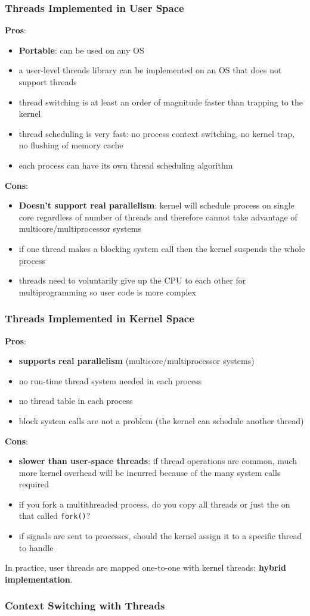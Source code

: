 \documentclass{article}
\renewcommand{\b}{\item[$\circ$]}
\newcommand{\newlist}{\begin{itemize}}
\renewcommand{\endlist}{\end{itemize}}
\begin{document}
    \subsubsection{Threads Implemented in User Space}

    \textbf{Pros}:
    \newlist
    \b \textbf{Portable}: can be used on any OS
    \b a user-level threads library can be implemented on an OS that does not support threads
    \b thread switching is at least an order of magnitude faster than trapping to the kernel
    \b thread scheduling is very fast: no process context switching, no kernel trap, no flushing of memory cache
    \b each process can have its own thread scheduling algorithm
    \endlist

    \noindent \textbf{Cons}:
    \newlist
    \b \textbf{Doesn't support real parallelism}: kernel will schedule process on single core regardless of number of threads and therefore cannot take advantage of multicore/multiprocessor systems
    \b if one thread makes a blocking system call then the kernel suspends the whole process
    \b threads need to voluntarily give up the CPU to each other for multiprogramming so user code is more complex
    \endlist

    \subsubsection{Threads Implemented in Kernel Space}

    \textbf{Pros}:
    \newlist
    \b \textbf{supports real parallelism} (multicore/multiprocessor systems)
    \b no run-time thread system needed in each process
    \b no thread table in each process
    \b block system calls are not a problem (the kernel can schedule another thread)
    \endlist

    \noindent \textbf{Cons}:
    \newlist
    \b \textbf{slower than user-space threads}: if thread operations are common, much more kernel overhead will be incurred because of the many system calls required
    \b if you fork a multithreaded process, do you copy all threads or just the on that called \texttt{fork()}?
    \b if signals are sent to processes, should the kernel assign it to a specific thread to handle
    \endlist

    \noindent In practice, user threads are mapped one-to-one with kernel threads: \textbf{hybrid implementation}. 

    \subsubsection{Context Switching with Threads}
\end{document}
